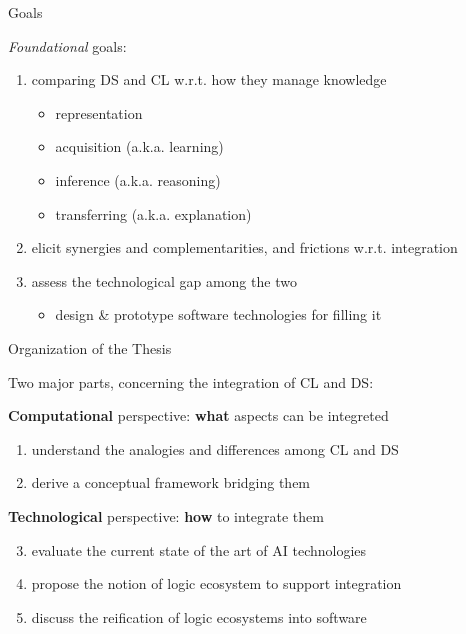 \documentclass[presentation]{beamer}\mode<presentation>{\usetheme{AMSBolognaFC}}
\begin{document}
\begin{frame}{Goals}

    \emph{Foundational} goals:
    \vfill
    \begin{enumerate}
        \item \alert{comparing} DS and CL w.r.t. how they manage \alert{knowledge}
        \begin{itemize}
            \item \alert{representation}
            \item acquisition (a.k.a. \alert{learning})
            \item inference (a.k.a. \alert{reasoning})
            \item transferring (a.k.a. \alert{explanation})
        \end{itemize}
        
        \vfill

        \item \alert{elicit} synergies and complementarities, and frictions w.r.t. \alert{integration}

        \vfill

        \item assess the \alert{technological gap} among the two
        \begin{itemize}
            \item design \& \alert{prototype software} technologies for filling it
        \end{itemize}
    \end{enumerate}
\end{frame}

\begin{frame}{Organization of the Thesis}

    Two major parts, concerning the integration of CL and DS:
    \vfill
    \begin{block}{\textbf{Computational} perspective: \textbf{what} aspects can be integreted}
        \begin{enumerate}
            \item understand the \alert{analogies} and \alert{differences} among CL and DS
            \item derive a \alert{conceptual framework} bridging them
        \end{enumerate}
    \end{block}
    \vfill
    \begin{block}{\textbf{Technological} perspective: \textbf{how} to integrate them}
        \begin{enumerate}\setcounter{enumi}{2}
            \item evaluate the current \alert{state of the art} of AI \alert{technologies}
            \item propose the notion of \alert{logic ecosystem} to support integration
            \item discuss the \alert{reification} of logic ecosystems into \alert{software}
        \end{enumerate}
    \end{block}

\end{frame}
\end{document}
